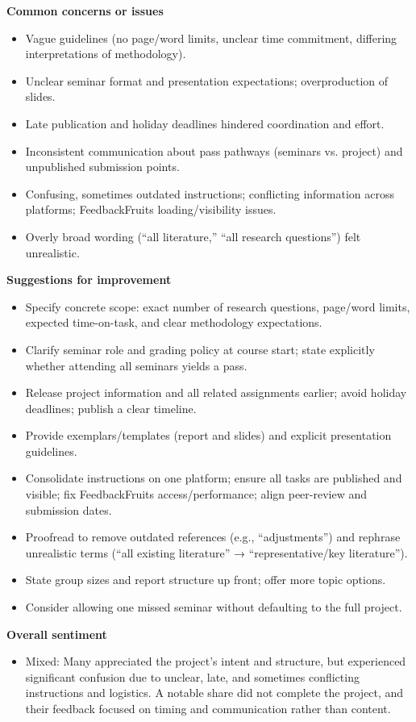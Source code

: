 \documentclass[a4paper]{report}
\begin{document}
\textbf{Common concerns or issues}
\begin{itemize}
\item Vague guidelines (no page/word limits, unclear time commitment, differing interpretations of methodology).
\item Unclear seminar format and presentation expectations; overproduction of slides.
\item Late publication and holiday deadlines hindered coordination and effort.
\item Inconsistent communication about pass pathways (seminars vs. project) and unpublished submission points.
\item Confusing, sometimes outdated instructions; conflicting information across platforms; FeedbackFruits loading/visibility issues.
\item Overly broad wording (“all literature,” “all research questions”) felt unrealistic.
\end{itemize}

\textbf{Suggestions for improvement}
\begin{itemize}
\item Specify concrete scope: exact number of research questions, page/word limits, expected time-on-task, and clear methodology expectations.
\item Clarify seminar role and grading policy at course start; state explicitly whether attending all seminars yields a pass.
\item Release project information and all related assignments earlier; avoid holiday deadlines; publish a clear timeline.
\item Provide exemplars/templates (report and slides) and explicit presentation guidelines.
\item Consolidate instructions on one platform; ensure all tasks are published and visible; fix FeedbackFruits access/performance; align peer-review and submission dates.
\item Proofread to remove outdated references (e.g., “adjustments”) and rephrase unrealistic terms (“all existing literature” → “representative/key literature”).
\item State group sizes and report structure up front; offer more topic options.
\item Consider allowing one missed seminar without defaulting to the full project.
\end{itemize}

\textbf{Overall sentiment}
\begin{itemize}
\item Mixed: Many appreciated the project’s intent and structure, but experienced significant confusion due to unclear, late, and sometimes conflicting instructions and logistics. A notable share did not complete the project, and their feedback focused on timing and communication rather than content.
\end{itemize}
\end{document}
